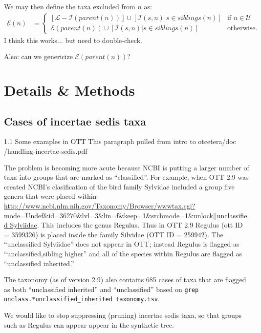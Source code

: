 \documentclass[english]{article}
\begin{document}
We may then define the taxa excluded from $n$ as:
\begin{align*}
\mathcal{E}(n) & =\begin{cases}
\left[\mathcal{L}-\mathcal{I}(parent(n))\right]\cup[\mathcal{I}(s,n)|s\in siblings(n)] & \text{if }n\in\mathcal{U}\\
\mathcal{E}(parent(n))\cup[\mathcal{I}(s,n)|s\in siblings(n)] & \text{otherwise.}
\end{cases}
\end{align*}
I think this works... but need to double-check.

Also: can we genericize $\mathcal{E}(parent(n))$?

\section{Details \& Methods}

\subsection{Cases of incertae sedis taxa}
1.1 Some examples in OTT This paragraph pulled from intro to
otcetera/doc /handling-incertae-sedis.pdf

The problem is becoming more acute because NCBI is putting a larger
number of taxa into groups that are marked as ``classified''. For
example, when OTT 2.9 was created NCBI's clasification of the bird
family Sylvidae included a group five genera that were placed within
\url{http://www.ncbi.nlm.nih.gov/Taxonomy/Browser/wwwtax.cgi?mode=Undef&id=36270&lvl=3&lin=f&keep=1&srchmode=1&unlock||unclassified Sylviidae}.
This includes the genus Regulus. Thus in OTT 2.9 Regulus (ott ID = 3599326) is placed inside the family Silvidae (OTT ID =
259942).
The ``unclassified Sylviidae'' does not appear in OTT; instead
Regulus is flagged as ``unclassified,sibling higher'' and all of the
species within Regulus are flagged as ``unclassified inherited.''

The taxonomy (as of version 2.9) also contains 685 cases of taxa that
are flagged as both ``unclassified inherited'' and ``unclassified'' based
on {\tt grep unclass.*unclassified\_inherited taxonomy.tsv}.

We would like to stop suppressing (pruning) incertae sedis taxa, so
that groups such as Regulus can appear appear in the synthetic tree.

\end{document}
